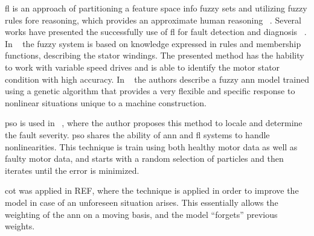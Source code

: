 \acrfull{fl} is an approach of partitioning a feature space info fuzzy sets and utilizing fuzzy rules fore reasoning, which provides an approximate human reasoning ~\cite{Gao2015}. Several works have presented the successfully use of \acrshort{fl} for fault detection and diagnosis ~\cite{Azgomi2013, Zidani2008, JoverRodriguez2008}.
In  ~\cite{JoverRodriguez2008} the fuzzy system is based on knowledge expressed in rules and membership functions, describing the stator windings. The presented method has the hability to work with variable speed drives and is able to identify the motor stator condition with high accuracy.
In ~\cite{Xu-hong2007} the authors describe a fuzzy \acrshort{ann}  model trained using a genetic algorithm that provides a very flexible and specific response to nonlinear situations unique to a machine construction.

\acrfull{pso} is used in ~\cite{Liu2006}, where the author proposes this method to locale and determine the fault severity. \acrshort{pso} shares the ability of \acrshort{ann} and \acrfull{fl} systems to handle nonlinearities. This technique is train using both healthy motor data as well as faulty motor data, and starts with a random selection of particles and then iterates until the error is minimized.
 
\acrfull{cot} was applied in REF, where the technique is applied in order to improve the model in case of an unforeseen situation arises. This essentially allows the weighting of the \acrshort{ann} on a moving basis, and the model “forgets” previous weights. 
